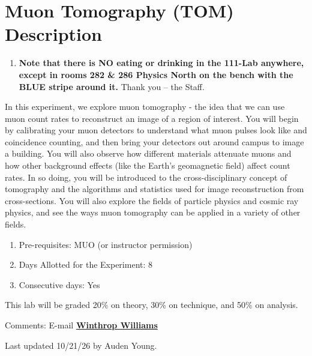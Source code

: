 \documentclass{../lab}
\begin{document}
\maketitle

\tableofcontents

\section{Muon Tomography (TOM) Description}

\begin{enumerate}
    \item \textbf{Note that there is NO eating or drinking in the 111-Lab anywhere, except in rooms 282 \& 286 Physics North on the bench with the BLUE stripe around it.} Thank you -- the Staff.

\end{enumerate}

In this experiment, we explore muon tomography - the idea that we can use muon count rates to reconstruct an image of a region of interest. You will begin by calibrating your muon detectors to understand what muon pulses look like and coincidence counting, and then bring your detectors out around campus to image a building. You will also observe how different materials attenuate muons and how other background effects (like the Earth's geomagnetic field) affect count rates. In so doing, you will be introduced to the cross-disciplinary concept of tomography and the algorithms and statistics used for image reconstruction from cross-sections. You will also explore the fields of particle physics and cosmic ray physics, and see the ways muon tomography can be applied in a variety of other fields.

\begin{enumerate}
    \item Pre-requisites: MUO (or instructor permission)

    \item Days Allotted for the Experiment: 8

    \item Consecutive days: Yes

\end{enumerate}


This lab will be graded 20\% on theory, 30\% on technique, and 50\% on analysis.

Comments: E-mail \href{\MailLabManager}{\textbf{Winthrop Williams}}

Last updated 10/21/26 by Auden Young.
\end{document}
